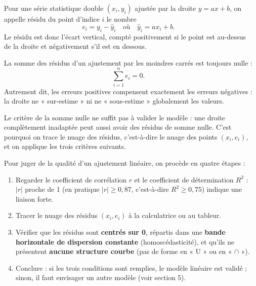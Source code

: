 \documentclass[11pt]{article}
\newcommand{\cle}[1]{{\popxbold\color{popdark}#1}}
\begin{document}
\begin{definition}[Résidu]
Pour une série statistique double $(x_i, y_i)$ ajustée par la droite $y = ax + b$, on appelle \cle{résidu} du point d'indice $i$ le nombre
\[ e_i = y_i - \hat{y}_i \quad \text{où} \quad \hat{y}_i = a x_i + b. \]
Le résidu est donc l'écart vertical, compté positivement si le point est au-dessus de la droite et négativement s'il est en dessous.
\end{definition}

\begin{propriete}
La somme des résidus d'un ajustement par les moindres carrés est toujours nulle :
\[ \sum_{i=1}^{n} e_i = 0. \]
Autrement dit, les erreurs positives compensent exactement les erreurs négatives : la droite ne « sur-estime » ni ne « sous-estime » globalement les valeurs.
\end{propriete}

Le critère de la somme nulle ne suffit pas à valider le modèle : une droite complètement inadaptée peut aussi avoir des résidus de somme nulle. C'est pourquoi on trace le \cle{nuage des résidus}, c'est-à-dire le nuage des points $(x_i, e_i)$, et on applique les trois critères suivants.

\begin{methode}
Pour juger de la qualité d'un ajustement linéaire, on procède en quatre étapes :
\begin{enumerate}
\item Regarder le coefficient de corrélation $r$ et le coefficient de détermination $R^2$ : $|r|$ proche de 1 (en pratique $|r| \geq 0{,}87$, c'est-à-dire $R^2 \geq 0{,}75$) indique une liaison forte.
\item Tracer le nuage des résidus $(x_i, e_i)$ à la calculatrice ou au tableur.
\item Vérifier que les résidus sont \textbf{centrés sur 0}, répartis dans une \textbf{bande horizontale de dispersion constante} (homoscédasticité), et qu'ils ne présentent \textbf{aucune structure courbe} (pas de forme en « U » ou en « $\cap$ »).
\item Conclure : si les trois conditions sont remplies, le modèle linéaire est validé ; sinon, il faut envisager un autre modèle (voir section 5).
\end{enumerate}
\end{methode}
\end{document}
